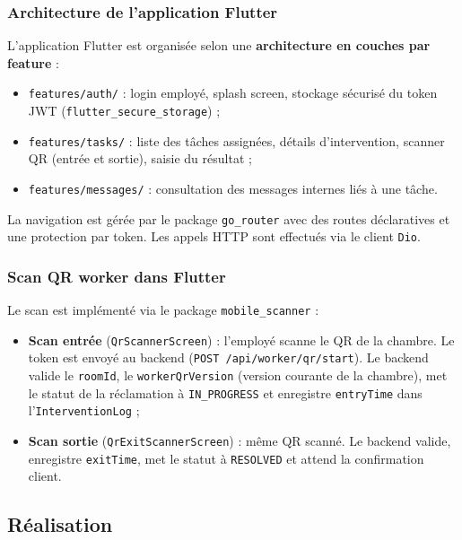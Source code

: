 \subsubsection{Architecture de l'application Flutter}

L'application Flutter est organisée selon une \textbf{architecture en couches par feature} :

\begin{itemize}
  \item \texttt{features/auth/} : login employé, splash screen, stockage sécurisé du token JWT (\texttt{flutter\_secure\_storage}) ;
  \item \texttt{features/tasks/} : liste des tâches assignées, détails d'intervention, scanner QR (entrée et sortie), saisie du résultat ;
  \item \texttt{features/messages/} : consultation des messages internes liés à une tâche.
\end{itemize}

La navigation est gérée par le package \texttt{go\_router} avec des routes déclaratives et une protection par token. Les appels HTTP sont effectués via le client \texttt{Dio}.

\subsubsection{Scan QR worker dans Flutter}

Le scan est implémenté via le package \texttt{mobile\_scanner} :
\begin{itemize}
  \item \textbf{Scan entrée} (\texttt{QrScannerScreen}) : l'employé scanne le QR de la chambre. Le token est envoyé au backend (\texttt{POST /api/worker/qr/start}). Le backend valide le \texttt{roomId}, le \texttt{workerQrVersion} (version courante de la chambre), met le statut de la réclamation à \texttt{IN\_PROGRESS} et enregistre \texttt{entryTime} dans l'\texttt{InterventionLog} ;
  \item \textbf{Scan sortie} (\texttt{QrExitScannerScreen}) : même QR scanné. Le backend valide, enregistre \texttt{exitTime}, met le statut à \texttt{RESOLVED} et attend la confirmation client.
\end{itemize}

\subsection{Réalisation}


